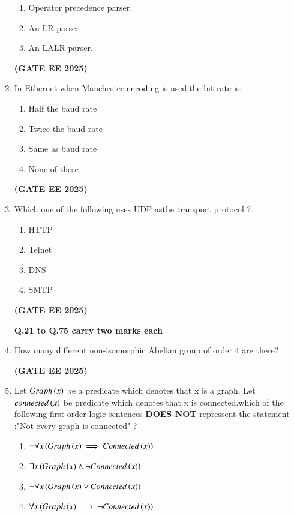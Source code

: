 \documentclass[journal,12pt,onecolumn]{IEEEtran}
\theoremstyle{remark}
\begin{document}
\begin{enumerate}
\begin{enumerate}
      \item Operator precedence parser.
      \item An LR  parser.
      \item An LALR parser.
  \end{enumerate}
\hfill \textbf{(GATE EE 2025)}
\item In Ethernet when Manchester encoding is used,the bit rate is:
\begin{enumerate}
    \item Half the baud rate
\item Twice the baud rate
\item Same as baud rate
\item None of these
\end{enumerate}
\hfill \textbf{(GATE EE 2025)}
\item    Which one of the following uses UDP asthe transport protocol ?
\begin {enumerate}
\item HTTP
\item Telnet
\item DNS
\item SMTP
\end{enumerate}
\hfill \textbf{(GATE EE 2025)}

 
\begin{center}
    \textbf{Q.21 to Q.75 carry two marks each}
\end{center}
\item How many different non-isomorphic Abelian group of order $4$ are there?
\begin{enumerate}
\end{enumerate}
\hfill \textbf{(GATE EE 2025)}
\item Let $Graph\left(x\right)$ be a predicate which denotes that x is a graph. Let $connected\left(x\right)$ be predicate which denotes that x is connected.which of the following first order logic sentences \textbf{DOES NOT} repressent the statement :"Not every graph  is connected" ?
\begin{enumerate}
    \item $\lnot\forall x \left(Graph\left(x\right)\implies Connected\left(x\right)\right)$
    \item $\exists x \left(Graph\left(x\right)\land\lnot Connected\left(x\right)\right)$
    \item $\lnot\forall x \left(Graph\left(x\right)\lor Connected\left(x\right)\right)$
    \item $\forall x \left(Graph\left(x\right)\implies\lnot Connected\left(x\right)\right)$
    

\end{enumerate}
\end{enumerate}
\end{document}
